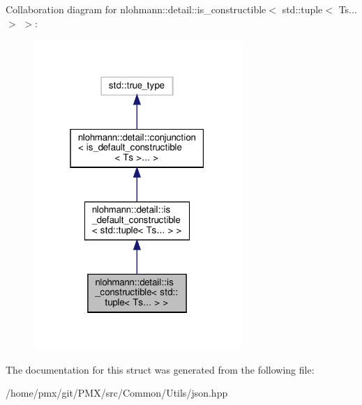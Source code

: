 Collaboration diagram for nlohmann\+:\+:detail\+:\+:is\+\_\+constructible$<$ std\+:\+:tuple$<$ Ts... $>$ $>$\+:
\nopagebreak
\begin{figure}[H]
\begin{center}
\leavevmode
\includegraphics[width=223pt]{structnlohmann_1_1detail_1_1is__constructible_3_01std_1_1tuple_3_01Ts_8_8_8_01_4_01_4__coll__graph}
\end{center}
\end{figure}


The documentation for this struct was generated from the following file\+:\begin{DoxyCompactItemize}
\item 
/home/pmx/git/\+P\+M\+X/src/\+Common/\+Utils/json.\+hpp\end{DoxyCompactItemize}

